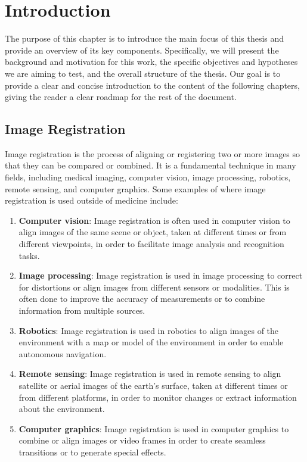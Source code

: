\documentclass{book}
\begin{document}
	\newpage
	
	\hypersetup{linkcolor=rwth-blue-1}
	\tableofcontents	

	\newpage
	
	\chapter{Introduction} \label{chap:intro}
	The purpose of this chapter is to introduce the main focus of this thesis and provide an overview of its key components. Specifically, we will present the background and motivation for this work, the specific objectives and hypotheses we are aiming to test, and the overall structure of the thesis. Our goal is to provide a clear and concise introduction to the content of the following chapters, giving the reader a clear roadmap for the rest of the document.
	
	\section{Image Registration}
	Image registration is the process of aligning or registering two or more images so that they can be compared or combined. It is a fundamental technique in many fields, including medical imaging, computer vision, image processing, robotics, remote sensing, and computer graphics. Some examples of where image registration is used outside of medicine include:
	\begin{enumerate}
		\item \textbf{Computer vision}: Image registration is often used in computer vision to align images of the same scene or object, taken at different times or from different viewpoints, in order to facilitate image analysis and recognition tasks.
		\item \textbf{Image processing}: Image registration is used in image processing to correct for distortions or align images from different sensors or modalities. This is often done to improve the accuracy of measurements or to combine information from multiple sources.
		\item \textbf{Robotics}: Image registration is used in robotics to align images of the environment with a map or model of the environment in order to enable autonomous navigation.
		\item \textbf{Remote sensing}: Image registration is used in remote sensing to align satellite or aerial images of the earth's surface, taken at different times or from different platforms, in order to monitor changes or extract information about the environment.
		\item \textbf{Computer graphics}: Image registration is used in computer graphics to combine or align images or video frames in order to create seamless transitions or to generate special effects.
	\end{enumerate}
	
\end{document}
